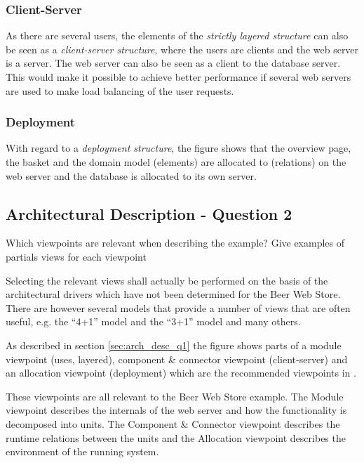 \subsubsection{Client-Server}

As there are several users, the elements of the
\emph{strictly layered structure} can also be seen as a
\emph{client-server structure}, where the users are clients
and the web server is a server. The web server can also be
seen as a client to the database server. This would make it
possible to achieve better performance if several web servers
are used to make load balancing of the user requests.

\subsubsection{Deployment}

With regard to a \emph{deployment structure}, the figure shows
that the overview page, the basket and the domain model (elements)
are allocated to (relations) on the web server and the database is
allocated to its own server.

\subsection{Architectural Description - Question 2}

\begin{question}
Which viewpoints are relevant when describing the example?
Give examples of partials views for each viewpoint
\end{question}

Selecting the relevant views shall actually be performed on
the basis of the architectural drivers which have not been
determined for the Beer Web Store. There are however several
models that provide a number of views that are often useful,
e.g. the ``4+1'' model \cite{kruchten1995} and the ``3+1''
model \cite{christensen2004archdesc} and many others.

As described in section \ref{sec:arch_desc_q1} the figure shows
parts of a module viewpoint (uses, layered), component \&
connector viewpoint (client-server) and an allocation viewpoint
(deployment) which are the recommended viewpoints in
\cite{christensen2004archdesc}.

These viewpoints are all relevant to the Beer Web Store example.
The Module viewpoint describes the internals of the web server and how
the functionality is decomposed into units. The Component \& Connector
viewpoint describes the runtime relations between the units and the
Allocation viewpoint describes the environment of the running
system.

